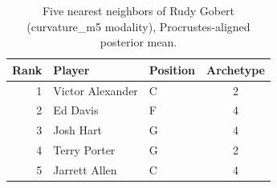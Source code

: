 \begin{table}[htbp]
  \centering\small
  \begin{tabular}{rllc}
    \toprule
    Rank & Player & Position & Archetype \\
    \midrule
    1 & Victor Alexander & C & 2 \\
    2 & Ed Davis & F & 4 \\
    3 & Josh Hart & G & 4 \\
    4 & Terry Porter & G & 2 \\
    5 & Jarrett Allen & C & 4 \\
    \bottomrule
  \end{tabular}
  \caption{Five nearest neighbors of Rudy Gobert (curvature_m5 modality), Procrustes-aligned posterior mean.}
  \label{tab:Rudy_Gobert_neighbors_curvature_m5}
\end{table}


